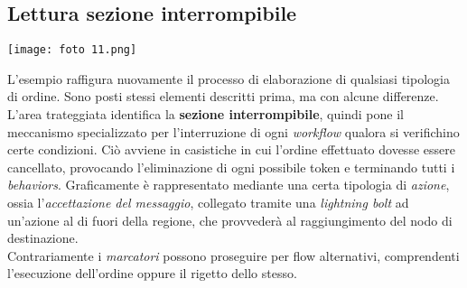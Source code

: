 \documentclass{article}
\begin{document}
\subsection*{Lettura sezione interrompibile}
\large
\begin{center}
    \texttt{[image: foto 11.png]}
\end{center}
L'esempio raffigura nuovamente il processo di elaborazione di qualsiasi tipologia di ordine. Sono posti stessi elementi descritti prima, ma con alcune differenze.\vspace*{14pt}\\
L'area trateggiata identifica la \textbf{sezione interrompibile}, quindi pone il meccanismo specializzato per l'interruzione di ogni \textit{workflow} qualora si verifichino certe condizioni. Ciò avviene in casistiche in cui l'ordine effettuato dovesse essere cancellato, provocando l'eliminazione di ogni possibile token e terminando tutti i \textit{behaviors}. Graficamente è rappresentato mediante una certa tipologia di \textit{azione}, ossia l'\textit{accettazione del messaggio}, collegato tramite una \textit{lightning bolt} ad un'azione al di fuori della regione, che provvederà al raggiungimento del nodo di destinazione.\vspace*{14pt}\\
Contrariamente i \textit{marcatori} possono proseguire per flow alternativi, comprendenti l'esecuzione dell'ordine oppure il rigetto dello stesso.
\end{document}
